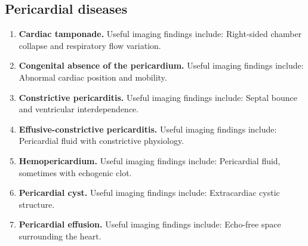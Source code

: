 \subsection{Pericardial diseases}
\begin{enumerate}[leftmargin=*,itemsep=0.45em,topsep=0.4em]
\item \textbf{Cardiac tamponade.} Useful imaging findings include: Right-sided chamber collapse and respiratory flow variation.
\item \textbf{Congenital absence of the pericardium.} Useful imaging findings include: Abnormal cardiac position and mobility.
\item \textbf{Constrictive pericarditis.} Useful imaging findings include: Septal bounce and ventricular interdependence.
\item \textbf{Effusive-constrictive pericarditis.} Useful imaging findings include: Pericardial fluid with constrictive physiology.
\item \textbf{Hemopericardium.} Useful imaging findings include: Pericardial fluid, sometimes with echogenic clot.
\item \textbf{Pericardial cyst.} Useful imaging findings include: Extracardiac cystic structure.
\item \textbf{Pericardial effusion.} Useful imaging findings include: Echo-free space surrounding the heart.
\end{enumerate}

